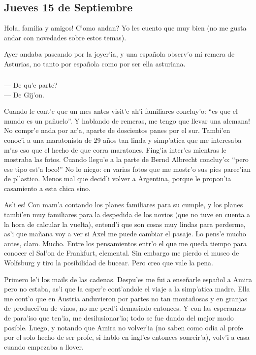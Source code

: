 \subsection*{Jueves 15 de Septiembre}

\textexclamdown Hola, familia y amigos! \textquestiondown C'omo andan? Yo les
cuento que muy bien (no me gusta andar con novedades sobre estos temas).

Ayer andaba paseando por la joyer'ia, y una espa\~nola observ'o mi remera de
Asturias, no tanto por espa\~nola como por ser ella asturiana.

\subparagraph{}\label{ssub:deQueParte} --- \textquestiondown De qu'e parte?\\
--- De Gij'on.\\ \hangindent=1cm

Cuando le cont'e que un mes antes visit'e ah'i familiares concluy'o: ``es que el
mundo es un pa\~nuelo''. Y hablando de remeras, \textexclamdown me tengo que
llevar una alemana! No compr'e nada por ac'a, aparte de doscientos panes por el
sur. Tambi'en conoc'i a una maratonista de 29 a\~nos tan linda y simp'atica que
me interesaba m'as eso que el hecho de que corra maratones. Fing'ia inter'es
mientras le mostraba las fotos. Cuando llegu'e a la parte de Bernd Albrecht
concluy'o: ``\textexclamdown pero ese tipo est'a loco!'' No lo niego: en varias
fotos que me mostr'o sus pies parec'ian de pl'astico. Menos mal que decid'i
volver a Argentina, porque le propon'ia casamiento a esta chica sino.

\textexclamdown As'i es! Con mam'a contando los planes familiares para su
cumple, y los planes tambi'en muy familiares para la despedida de los novios
(que no tuve en cuenta a la hora de calcular la vuelta), entend'i que son cosas
muy lindas para perderme, as'i que ma\~nana voy a ver si Axel me puede cambiar
el pasaje. Lo pens'e mucho antes, claro. Mucho. Entre los pensamientos entr'o el
que me queda tiempo para conocer el Sal'on de Frankfurt, elemental. Sin embargo
me pierdo el museo de Wolfsburg y tiro la posibilidad de bucear. Pero creo que
vale la pena.

Primero le'i los mails de las cadenas. Despu'es me fui a ense\~narle espa\~nol a
Amira pero no estaba, as'i que la esper'e cont'andole el viaje a la simp'atica
madre. Ella me cont'o que en Austria anduvieron por partes no tan monta\~nosas y
en granjas de producci'on de vinos, no me perd'i demasiado entonces. Y con las
esperanzas de para'iso que ten'ia, me desilusionar'ia; todo se fue dando del
mejor modo posible. Luego, y notando que Amira no volver'ia (no saben como odia
al profe por el solo hecho de ser profe, si hablo en ingl'es entonces
sonreir'a), volv'i a casa cuando empezaba a llover.

